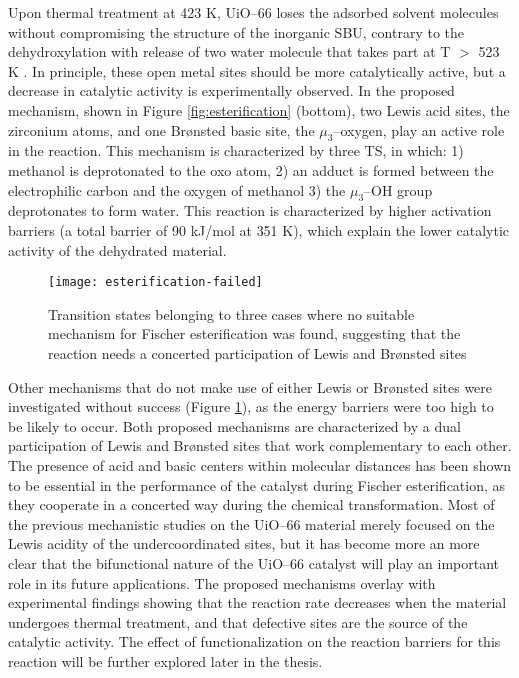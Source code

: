Upon thermal treatment at 423 K, UiO--66 loses the adsorbed solvent molecules without compromising the structure of the inorganic SBU, contrary to the dehydroxylation with release of two water molecule that takes part at T $>$ 523 K \cite{shearer2013situ}. In principle, these open metal sites should be more catalytically active, but a decrease in catalytic activity is experimentally observed. In the proposed mechanism, shown in Figure \ref{fig:esterification} (bottom), two Lewis acid sites, the zirconium atoms, and one Br\o{}nsted basic site, the $\mu_3$--oxygen, play an active role in the reaction. This mechanism is characterized by three TS, in which: 1) methanol is deprotonated to the oxo atom, 2) an adduct is formed between the electrophilic carbon and the oxygen of methanol 3) the $\mu_3$--OH group deprotonates to form water. This reaction is characterized by higher activation barriers (a total barrier of 90 kJ/mol at 351 K), which explain the lower catalytic activity of the dehydrated material.
\npar
\begin{figure}[!htbp]
	\centering
	\texttt{[image: esterification-failed]}
	\caption{Transition states belonging to three cases where no suitable mechanism for Fischer esterification was found, suggesting that the reaction needs a concerted participation of Lewis and Br\o{}nsted sites}
	\label{fig:esterification-failed}
\end{figure}
Other mechanisms that do not make use of either Lewis or Br\o{}nsted sites were investigated without success (Figure \ref{fig:esterification-failed}), as the energy barriers were too high to be likely to occur. Both proposed mechanisms are characterized by a dual participation of Lewis and Br\o{}nsted sites that work complementary to each other. The presence of acid and basic centers within molecular distances has been shown to be essential in the performance of the catalyst during Fischer esterification, as they cooperate in a concerted way during the chemical transformation. Most of the previous mechanistic studies on the UiO--66 material merely focused on the Lewis acidity of the undercoordinated sites, but it has become more an more clear that the bifunctional nature of the UiO--66 catalyst will play an important role in its future applications.
\npar
The proposed mechanisms overlay with experimental findings showing that the reaction rate decreases when the material undergoes thermal treatment, and that defective sites are the source of the catalytic activity. The effect of functionalization on the reaction barriers for this reaction will be further explored later in the thesis.

